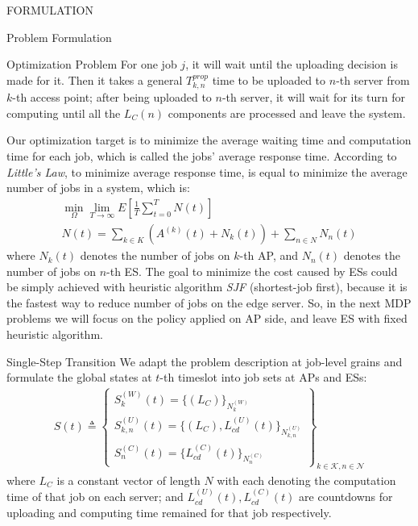 \documentclass[10pt, conference, letterpaper]{IEEEtran}
\begin{document}
\begin{section}{FORMULATION}
\begin{subsection}{Problem Formulation}
\begin{subsubsection}{Optimization Problem}
                For one job $j$, it will wait until the uploading decision is made for it. Then it takes a general $T^{prop}_{k,n}$ time to be uploaded to $n$-th server from $k$-th access point; after being uploaded to $n$-th server, it will wait for its turn for computing until all the $L_C(n)$ components are processed and leave the system.
                
                Our optimization target is to minimize the average waiting time and computation time for each job, which is called the jobs' average response time. According to \emph{Little’s Law}, to minimize average response time, is equal to minimize the average number of jobs in a system, which is:
                \begin{gather}
                    \min_{\Omega} \lim_{T \to \infty} E[\frac{1}{T} \sum_{t=0}^{T} N(t)]
                    \\
                    N(t) = \sum_{k \in K} (A^{(k)}(t) + N_k(t))
                            + \sum_{n \in N} N_n(t)
                \end{gather}
                where $N_k(t)$ denotes the number of jobs on $k$-th AP, and $N_n(t)$ denotes the number of jobs on $n$-th ES.
                The goal to minimize the cost caused by ESs could be simply achieved with heuristic algorithm \emph{SJF} (shortest-job first), because it is the fastest way to reduce number of jobs on the edge server. So, in the next MDP problems we will focus on the policy applied on AP side, and leave ES with fixed heuristic algorithm.
            \end{subsubsection}

            \begin{subsubsection}{Single-Step Transition}
                We adapt the problem description at job-level grains and formulate the global states at $t$-th timeslot into job sets at APs and ESs:
                \begin{align}
                    S(t) \triangleq
                    \begin{Bmatrix}
                        S_{k}^{(W)}(t) = \{ (L_C) \}_{N_{k}^{(W)}}
                        \\
                        S_{k,n}^{(U)}(t)= \{ (L_C), L_{cd}^{(U)}(t) \}_{N_{k,n}^{(U)}}
                        \\
                        S_{n}^{(C)}(t)  = \{ L_{cd}^{(C)}(t) \}_{N_{n}^{(C)}}
                    \end{Bmatrix}
                    _{k\in\mathcal{K}, n\in\mathcal{N}}
                \end{align}
                where $L_C$ is a constant vector of length $N$ with each denoting the computation time of that job on each server; and $L^{(U)}_{cd}(t), L^{(C)}_{cd}(t)$ are countdowns for uploading and computing time remained for that job respectively.
            

\end{subsubsection}
\end{subsection}
\end{section}
\end{document}
